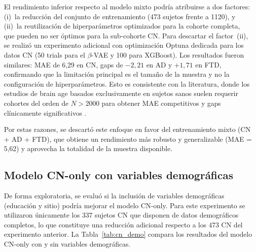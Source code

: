 El rendimiento inferior respecto al modelo mixto podría atribuirse a dos factores: (i)~la reducción del conjunto de entrenamiento (473 sujetos frente a 1120), y (ii)~la reutilización de hiperparámetros optimizados para la cohorte completa, que pueden no ser óptimos para la sub-cohorte CN. Para descartar el factor~(ii), se realizó un experimento adicional con optimización Optuna dedicada para los datos CN (50 trials para el $\beta$-VAE y 100 para XGBoost). Los resultados fueron similares: MAE de 6,29 en CN, gaps de $-2{,}21$ en AD y $+1{,}71$ en FTD, confirmando que la limitación principal es el tamaño de la muestra y no la configuración de hiperparámetros. Esto es consistente con la literatura, donde los estudios de brain age basados exclusivamente en sujetos sanos suelen requerir cohortes del orden de $N > 2000$ para obtener MAE competitivos y gaps clínicamente significativos \cite{franke2010estimating}.

Por estas razones, se descartó este enfoque en favor del entrenamiento mixto (CN + AD + FTD), que obtiene un rendimiento más robusto y generalizable (MAE = 5,62) y aprovecha la totalidad de la muestra disponible.

\subsection{Modelo CN-only con variables demográficas}
\label{sec:res_cn_demo}

De forma exploratoria, se evaluó si la inclusión de variables demográficas (educación y sitio) podría mejorar el modelo CN-only. Para este experimento se utilizaron únicamente los 337 sujetos CN que disponen de datos demográficos completos, lo que constituye una reducción adicional respecto a los 473 CN del experimento anterior. La Tabla~\ref{tab:cn_demo} compara los resultados del modelo CN-only con y sin variables demográficas.

